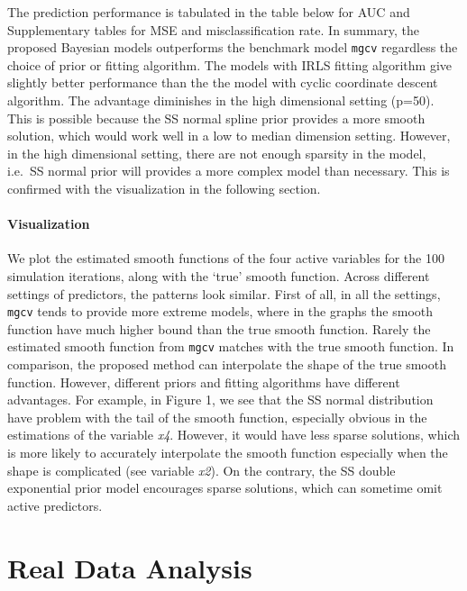 \documentclass[AMA,STIX1COL,]{WileyNJD-v2}
\begin{document}
The prediction performance is tabulated in the table below for AUC and
Supplementary tables for MSE and misclassification rate. In summary, the
proposed Bayesian models outperforms the benchmark model \texttt{mgcv}
regardless the choice of prior or fitting algorithm. The models with
IRLS fitting algorithm give slightly better performance than the the
model with cyclic coordinate descent algorithm. The advantage diminishes
in the high dimensional setting (p=50). This is possible because the SS
normal spline prior provides a more smooth solution, which would work
well in a low to median dimension setting. However, in the high
dimensional setting, there are not enough sparsity in the model, i.e.~SS
normal prior will provides a more complex model than necessary. This is
confirmed with the visualization in the following section.

\hypertarget{visualization}{%
\paragraph{Visualization}\label{visualization}}

We plot the estimated smooth functions of the four active variables for
the 100 simulation iterations, along with the `true' smooth function.
Across different settings of predictors, the patterns look similar.
First of all, in all the settings, \texttt{mgcv} tends to provide more
extreme models, where in the graphs the smooth function have much higher
bound than the true smooth function. Rarely the estimated smooth
function from \texttt{mgcv} matches with the true smooth function. In
comparison, the proposed method can interpolate the shape of the true
smooth function. However, different priors and fitting algorithms have
different advantages. For example, in Figure 1, we see that the SS
normal distribution have problem with the tail of the smooth function,
especially obvious in the estimations of the variable \emph{x4}.
However, it would have less sparse solutions, which is more likely to
accurately interpolate the smooth function especially when the shape is
complicated (see variable \emph{x2}). On the contrary, the SS double
exponential prior model encourages sparse solutions, which can sometime
omit active predictors.

\hypertarget{real-data-analysis}{%
\section{Real Data Analysis}\label{real-data-analysis}}
\end{document}
